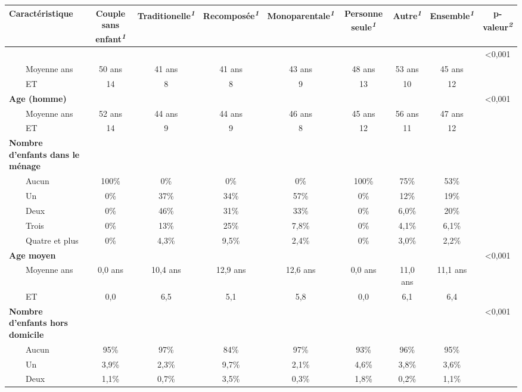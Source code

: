 \documentclass[
  12pt,
]{book}
\begin{document}
\begingroup
\fontsize{9.8pt}{11.7pt}\selectfont
\setlength{\LTpost}{0mm}
\begin{longtable}{lcccccccc}
\toprule
\textbf{Caractéristique} & \textbf{Couple sans enfant}\textsuperscript{\textit{1}} & \textbf{Traditionelle}\textsuperscript{\textit{1}} & \textbf{Recomposée}\textsuperscript{\textit{1}} & \textbf{Monoparentale}\textsuperscript{\textit{1}} & \textbf{Personne seule}\textsuperscript{\textit{1}} & \textbf{Autre}\textsuperscript{\textit{1}} & \textbf{Ensemble}\textsuperscript{\textit{1}} & \textbf{p-valeur}\textsuperscript{\textit{2}} \\ 
\midrule\addlinespace[2.5pt]
{\bfseries Age (femme)} &  &  &  &  &  &  &  & <0,001 \\ 
    Moyenne ans & 50 ans & 41 ans & 41 ans & 43 ans & 48 ans & 53 ans & 45 ans &  \\ 
    ET & 14 & 8 & 8 & 9 & 13 & 10 & 12 &  \\ 
{\bfseries Age (homme)} &  &  &  &  &  &  &  & <0,001 \\ 
    Moyenne ans & 52 ans & 44 ans & 44 ans & 46 ans & 45 ans & 56 ans & 47 ans &  \\ 
    ET & 14 & 9 & 9 & 8 & 12 & 11 & 12 &  \\ 
{\bfseries Nombre d'enfants dans le ménage} &  &  &  &  &  &  &  &  \\ 
    Aucun & 100\% & 0\% & 0\% & 0\% & 100\% & 75\% & 53\% &  \\ 
    Un & 0\% & 37\% & 34\% & 57\% & 0\% & 12\% & 19\% &  \\ 
    Deux & 0\% & 46\% & 31\% & 33\% & 0\% & 6,0\% & 20\% &  \\ 
    Trois & 0\% & 13\% & 25\% & 7,8\% & 0\% & 4,1\% & 6,1\% &  \\ 
    Quatre et plus & 0\% & 4,3\% & 9,5\% & 2,4\% & 0\% & 3,0\% & 2,2\% &  \\ 
{\bfseries Age moyen} &  &  &  &  &  &  &  & <0,001 \\ 
    Moyenne ans & 0,0 ans & 10,4 ans & 12,9 ans & 12,6 ans & 0,0 ans & 11,0 ans & 11,1 ans &  \\ 
    ET & 0,0 & 6,5 & 5,1 & 5,8 & 0,0 & 6,1 & 6,4 &  \\ 
{\bfseries Nombre d'enfants hors domicile} &  &  &  &  &  &  &  & <0,001 \\ 
    Aucun & 95\% & 97\% & 84\% & 97\% & 93\% & 96\% & 95\% &  \\ 
    Un & 3,9\% & 2,3\% & 9,7\% & 2,1\% & 4,6\% & 3,8\% & 3,6\% &  \\ 
    Deux & 1,1\% & 0,7\% & 3,5\% & 0,3\% & 1,8\% & 0,2\% & 1,1\% &  \\ 

\end{longtable}
\end{document}
